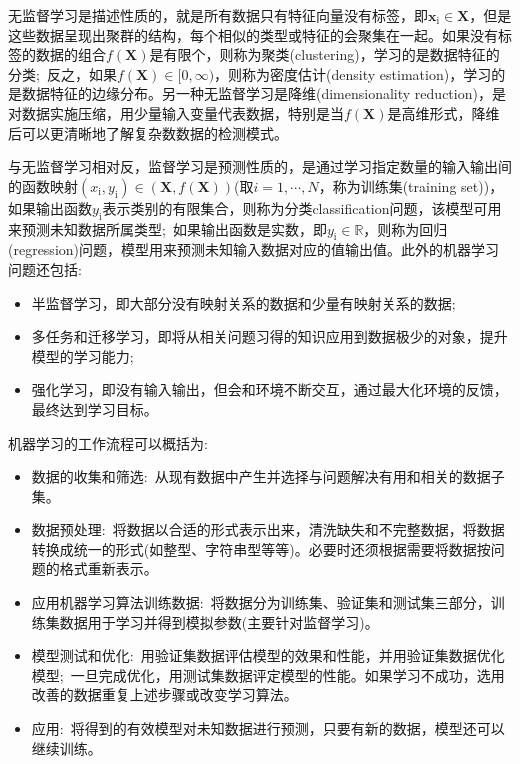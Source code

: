 \documentclass[10pt, oneside, a4paper]{article}      %
\newcommand{\upcite}[1]{\hspace{0ex}\textsuperscript{\cite{#1}}} %
\begin{document}
无监督学习是描述性质的，就是所有数据只有特征向量没有标签，即$\mathbf{x}_{\mathrm{i}}\in\mathbf{X}$，但是这些数据呈现出聚群的结构，每个相似的类型或特征的会聚集在一起。如果没有标签的数据的组合$f(\mathbf{X})$是有限个，则称为聚类\textrm{(clustering)}，学习的是数据特征的分类;~反之，如果$f(\mathbf{X})\in[0,\infty)$，则称为密度估计\textrm{(density estimation)}，学习的是数据特征的边缘分布。另一种无监督学习是降维\textrm{(dimensionality reduction)}，是对数据实施压缩，用少量输入变量代表数据，特别是当$f(\mathbf{X})$是高维形式，降维后可以更清晰地了解复杂数数据的检测模式。

与无监督学习相对反，监督学习是预测性质的，是通过学习指定数量的输入输出间的函数映射$(x_{\mathrm{i}},y_{\mathrm{i}})\in(\mathbf{X},f(\mathbf{X}))$(取$i=1,\cdots,N$，称为训练集\textrm{(training set)})，如果输出函数$y_{\mathrm{i}}$表示类别的有限集合，则称为分类\textrm{classification}问题，该模型可用来预测未知数据所属类型;~如果输出函数是实数，即$y_\mathrm{i}\in\mathbb{R}$，则称为回归\textrm{(regression)}问题，模型用来预测未知输入数据对应的值输出值。此外的机器学习问题还包括:~
\begin{itemize}
	\item 半监督学习，即大部分没有映射关系的数据和少量有映射关系的数据;
	\item 多任务和迁移学习，即将从相关问题习得的知识应用到数据极少的对象，提升模型的学习能力;
	\item 强化学习，即没有输入输出，但会和环境不断交互，通过最大化环境的反馈，最终达到学习目标。
\end{itemize}

机器学习的工作流程可以概括为\upcite{Efficient_ML}:
\begin{itemize}
	\item 数据的收集和筛选:~从现有数据中产生并选择与问题解决有用和相关的数据子集。
	\item 数据预处理:~将数据以合适的形式表示出来，清洗缺失和不完整数据，将数据转换成统一的形式(如整型、字符串型等等)。必要时还须根据需要将数据按问题的格式重新表示。
	\item 应用机器学习算法训练数据:~将数据分为训练集、验证集和测试集三部分，训练集数据用于学习并得到模拟参数(主要针对监督学习)。
	\item 模型测试和优化:~用验证集数据评估模型的效果和性能，并用验证集数据优化模型;~一旦完成优化，用测试集数据评定模型的性能。如果学习不成功，选用改善的数据重复上述步骤或改变学习算法。
	\item 应用:~将得到的有效模型对未知数据进行预测，只要有新的数据，模型还可以继续训练。
\end{itemize}
\end{document}
